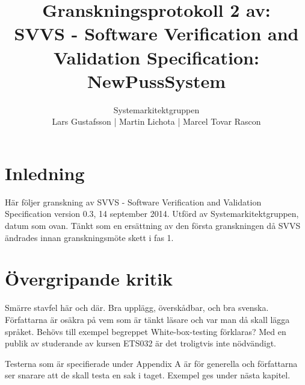 \documentclass[a4paper]{article}
\title{Granskningsprotokoll 2 av:\\ SVVS - Software Verification and Validation Specification: NewPussSystem}
\author{Systemarkitektgruppen \\ Lars Gustafsson | Martin Lichota | Marcel Tovar Rascon}
\date{}
\begin{document}
\maketitle
\thispagestyle{fancy}

\section{Inledning}       
Här följer granskning av SVVS - Software Verification and Validation Specification version 0.3, 14 september 2014. Utförd av Systemarkitektgruppen, datum som ovan. Tänkt som en ersättning av den första granskningen då SVVS ändrades innan granskningsmöte skett i fas 1.

\section{Övergripande kritik}
Smärre stavfel här och där. Bra upplägg, överskådbar, och bra svenska.
Författarna är osäkra på vem som är tänkt läsare och var man då skall lägga språket. Behövs till exempel begreppet White-box-testing förklaras? Med en publik av studerande av kursen ETS032 är det troligtvis inte nödvändigt.

Testerna som är specifierade under Appendix A är för generella och författarna ser snarare att de skall testa en sak i taget. Exempel ges under nästa kapitel.
\end{document}
